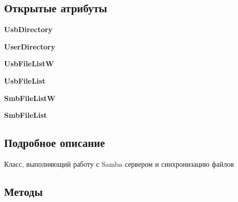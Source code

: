 \subsection*{Открытые атрибуты}
\begin{DoxyCompactItemize}
\item 
\mbox{\label{classisofc-service_1_1SambaConnect_a767da85da916ca28133a064ffec5226a}} 
{\bfseries Usb\+Directory}
\item 
\mbox{\label{classisofc-service_1_1SambaConnect_a9dbdd0637919c53f4e418a60947bf0a8}} 
{\bfseries User\+Directory}
\item 
\mbox{\label{classisofc-service_1_1SambaConnect_ace6db57e15b3072564e64158acdae12d}} 
{\bfseries Usb\+File\+ListW}
\item 
\mbox{\label{classisofc-service_1_1SambaConnect_a63c3cf060d4a486fc6b519e672d5b06e}} 
{\bfseries Usb\+File\+List}
\item 
\mbox{\label{classisofc-service_1_1SambaConnect_af494c5da04a261fa643e045bc1574c62}} 
{\bfseries Smb\+File\+ListW}
\item 
\mbox{\label{classisofc-service_1_1SambaConnect_a1f623e59b471b27d3f9146cfcb3b83c0}} 
{\bfseries Smb\+File\+List}
\end{DoxyCompactItemize}


\subsection{Подробное описание}
Класс, выполняющий работу с Samba сервером и синхронизацию файлов 

\subsection{Методы}
\mbox{\label{classisofc-service_1_1SambaConnect_a21b2d32bfb95e56cf146499a1f1b48f0}} 
